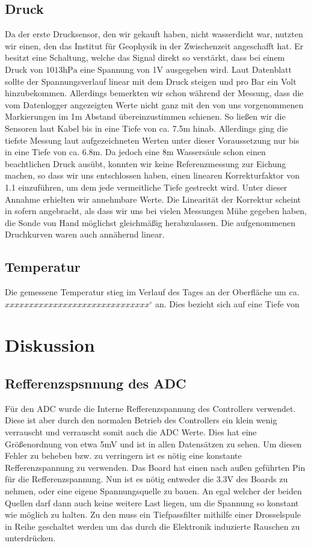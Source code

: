 \documentclass[12pt,a4paper,titlepage,headinclude,bibtotoc]{scrartcl}
\begin{document}
\subsection{Druck}
Da der erste Drucksensor, den wir gekauft haben, nicht wasserdicht war, nutzten wir einen, den das Institut für Geophysik in der Zwischenzeit angeschafft hat.
Er besitzt eine Schaltung, welche das Signal direkt so verstärkt, dass bei einem Druck von $1013\si{\hecto\pascal}$ eine Spannung von 1V ausgegeben wird.
Laut Datenblatt sollte der Spannungsverlauf linear mit dem Druck steigen und pro Bar ein Volt hinzubekommen.
Allerdings bemerkten wir schon während der Messung, dass die vom Datenlogger angezeigten Werte nicht ganz mit den von uns vorgenommenen Markierungen im 1m Abstand übereinzustimmen schienen.
So ließen wir die Sensoren laut Kabel bis in eine Tiefe von ca. 7.5m hinab.
Allerdings ging die tiefste Messung laut aufgezeichneten Werten unter dieser Voraussetzung nur bis in eine Tiefe von ca. 6.8m.
Da jedoch eine 8m Wassersäule schon einen beachtlichen Druck ausübt, konnten wir keine Referenzmessung zur Eichung machen, so dass wir uns entschlossen haben, einen linearen Korrekturfaktor von 1.1 einzuführen, um dem jede vermeitliche Tiefe gestreckt wird.
Unter dieser Annahme erhielten wir annehmbare Werte.
Die Linearität der Korrektur scheint in sofern angebracht, als dass wir uns bei vielen Messungen Mühe gegeben haben, die Sonde von Hand möglichst gleichmäßig herabzulassen.
Die aufgenommenen Druchkurven waren auch annähernd linear.


\subsection{Temperatur}
Die gemessene Temperatur stieg im Verlauf des Tages an der Oberfläche um ca. $xxxxxxxxxxxxxxxxxxxxxxxxxxxxxx^\circ$ an.
Dies bezieht sich auf eine Tiefe von  


\section{Diskussion}
\label{sec:diskussion}

\subsection{Refferenzspsnnung des ADC}
Für den ADC wurde die Interne Refferenzspannung des Controllers verwendet.
Diese ist aber durch den normalen Betrieb des Controllers ein klein wenig verrauscht und verrauscht somit auch die ADC Werte.
Dies hat eine Größenordnung von etwa 5\si{\milli\volt} und ist in allen Datensätzen zu sehen.
Um diesen Fehler zu beheben bzw. zu verringern ist es nötig eine konstante Refferenzspannung zu verwenden.
Das Board hat einen nach außen geführten Pin für die Refferenzspannung.
Nun ist es nötig entweder die 3.3\si{\volt} des Boards zu nehmen, oder eine eigene Spannungsquelle zu bauen.
An egal welcher der beiden Quellen darf dann auch keine weitere Last liegen, um die Spannung so konstant wie möglich zu halten.
Zu den muss ein Tiefpassfilter mithilfe einer Drosselspule in Reihe geschaltet werden um das durch die Elektronik induzierte Rauschen zu unterdrücken.
\end{document}
